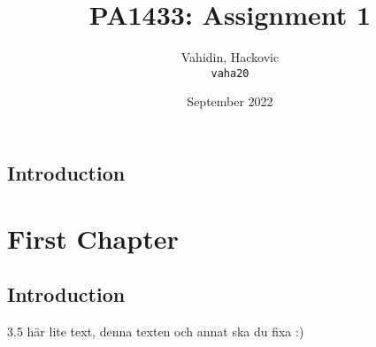 \documentclass{article}
\title{PA1433: Assignment 1}
\author{
  Vahidin, Hackovic\\
  \texttt{vaha20}
}
\date{September 2022}
\begin{document}
    \maketitle
    \section{Introduction}

    \chapter{First Chapter}
    \section{Introduction}

    3.5
    här lite text, denna texten och annat ska du fixa :)
\end{document}
